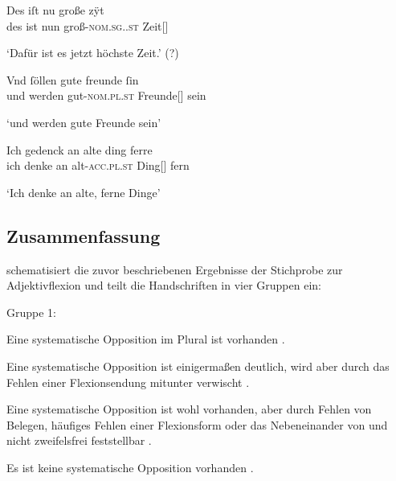 \begin{exe}
\ex \label{ex:kczregel}
	\begin{xlist}
	\ex \label{ex:kczregel_1}
		\gll Des iſt nu große zÿt \\
			des ist nun groß-\textsc{nom.sg.\FemI.st} Zeit[\FemI] \\
		\begin{taggedline}{\parencites[\pno~233\ra, 17]{kc:Z}[zu][11620]{schroeder1895}}
		\trans `Dafür ist es jetzt höchste Zeit.' (?)
		\end{taggedline}

	\ex \label{ex:kczregel_2}
		\gll Vnd ſöllen gute freunde ſin \\
			und werden gut-\textsc{nom.pl.st} Freunde[\MascA] sein \\
		\begin{taggedline}{\parencites[\pno~61\va, 1]{kc:Z}[vgl.][3089]{schroeder1895}}
		\trans `und werden gute Freunde sein'
		\end{taggedline}

	\ex \label{ex:kczregel_3}
		\gll Ich gedenck an alte ding ferre \\
			ich denke an alt-\textsc{acc.pl.st} Ding[\NeutI] fern \\
		\begin{taggedline}{\parencites[\pno~135\ra, 9]{kc:Z}[vgl.][6849]{schroeder1895}}
		\trans `Ich denke an alte, ferne Dinge'
		\end{taggedline}
	\end{xlist}
\end{exe}

\subsection{Zusammenfassung}

 schematisiert die zuvor beschriebenen Ergebnisse der
Stichprobe zur Adjektivflexion und teilt die Handschriften in vier Gruppen ein:

\begin{labeling}{Gruppe 1:}
	\item[Gruppe 1:] Eine systematische Opposition im Plural ist vorhanden
	\autocites{kc:A1}{kc:B1}.

	\item[Gruppe 2:] Eine systematische Opposition ist einigermaßen deutlich,
	wird aber durch das Fehlen einer Flexionsendung mitunter verwischt
	\autocites{kc:C1}.

	\item[Gruppe 3:] Eine systematische Opposition ist wohl vorhanden, aber
	durch Fehlen von Belegen, häufiges Fehlen einer Flexionsform oder das
	Nebeneinander von  und  nicht zweifelsfrei feststellbar
	\autocites{kc:M}{kc:VB}{kc:K}.

	\item[Gruppe 4:] Es ist keine systematische Opposition vorhanden
	\autocites{kc:H}{kc:P}{kc:Z}.
\end{labeling}


